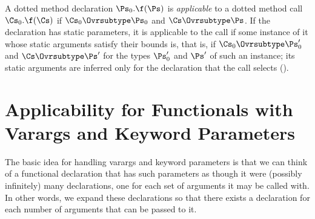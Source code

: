 A dotted method declaration $\Ps_0.\f(\Ps)$ is \emph{applicable}
to a dotted method call $\Cs_0.\f(\Cs)$ if $\Cs_0 \Ovrsubtype
\Ps_0$ and $\Cs \Ovrsubtype \Ps$.
If the declaration has static parameters, it is applicable to the call if some
instance of it whose static arguments satisfy their bounds is, that is, if
$\Cs_0 \Ovrsubtype \Ps_0'$ and $\Cs \Ovrsubtype \Ps'$ for the types $\Ps_0'$
and $\Ps'$ of such an instance; its static arguments are inferred only for the
declaration that the call selects ().



\section{Applicability for Functionals with Varargs and Keyword Parameters}

The basic idea for handling varargs and keyword
parameters is that we
can think of a functional declaration that has such parameters as
though it were (possibly infinitely) many declarations, one for each
set of arguments it may be called with.  In other words, we expand
these declarations so that there exists a declaration for each number
of arguments that can be passed to it.


